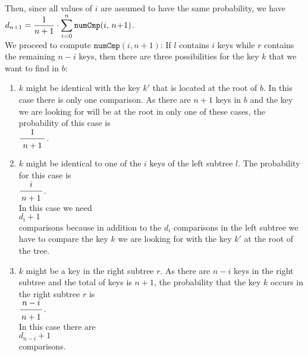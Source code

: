 \\[0.2cm]
Then, since all values of $i$ are assumed to have the same probability, we have
\\[0.2cm]
\hspace*{1.3cm}
$\displaystyle d_{n+1} =  \frac{1}{n+1} \cdot \sum\limits_{i=0}^n \texttt{numCmp}(i,\, n\!+\!1)$.
\\[0.2cm]
We proceed to compute $\texttt{numCmp}(i,n\!+\!1)$:
If  $l$ contains $i$ keys while $r$ contains the remaining $n-i$ keys,
then there are three possibilities for the key $k$ that we want to find in $b$:
\begin{enumerate}
\item $k$ might be identical with the key $k'$ that is located at the root of $b$.
      In this case there is only one comparison.
      As there  are $n+1$ keys in $b$ and the key we are looking for will be at the root in only
      one of these cases, the probability of this case is
      \\[0.2cm]
      \hspace*{1.3cm} $\bruch{1}{\,n+1\,}$.

\item $k$ might be identical to one of the  $i$ keys of the left subtree $l$.
      The probability for this case is 
      \\[0.2cm]
      \hspace*{1.3cm} $\displaystyle\bruch{i}{n+1}$. \\[0.2cm]
      In this case we need 
      \\[0.2cm]
      \hspace*{1.3cm} $\displaystyle d_i + 1$ \\[0.2cm]
      comparisons because in addition to the  $d_i$ comparisons in the left subtree we have to
      compare the key $k$ we are looking for with the key $k'$ at the root of the tree.
\item $k$ might be a key in the right subtree $r$.  As there are  $n-i$ keys in the right subtree
      and the total of keys is $n+1$, the probability that the key  $k$ occurs in the right subtree $r$
      is \\[0.2cm]
      \hspace*{1.3cm} $\displaystyle \bruch{n-i}{n+1}$. \\[0.2cm]
      In this case there are  \\[0.2cm]
      \hspace*{1.3cm} $\displaystyle d_{n-i} + 1$ \\[0.2cm]
      comparisons. 
\end{enumerate}

